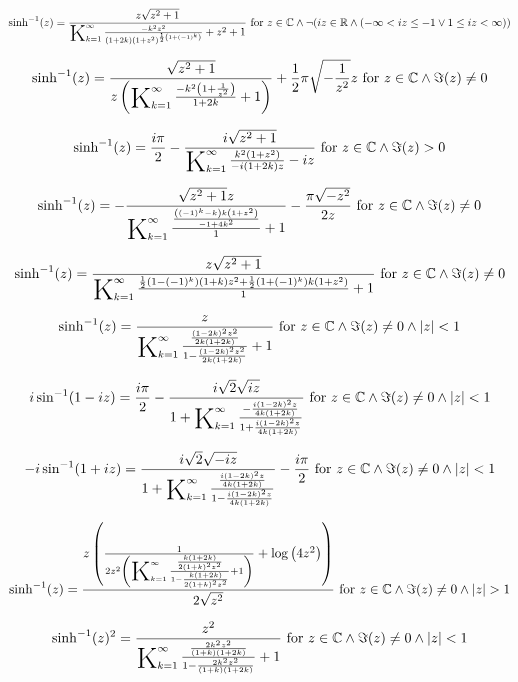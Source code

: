 \documentclass{article}
\newcommand{\bigK}{\mathop{\raisebox{-5pt}{\huge K}}}
\begin{document}
\[\sinh ^{-1}(z)=\frac{z \sqrt{z^2+1}}{\bigK_{k=1}^{\infty}\frac{-k^2 z^2}{(1+2 k) \left(1+z^2\right)^{\frac{1}{2} \left(1+(-1)^k\right)}}+z^2+1}\text{ for }z\in \mathbb{C}\land \neg (i z\in \mathbb{R}\land (-\infty <i z\leq -1\lor 1\leq i z<\infty ))\] 

\[\sinh ^{-1}(z)=\frac{\sqrt{z^2+1}}{z \left(\bigK_{k=1}^{\infty}\frac{-k^2 \left(1+\frac{1}{z^2}\right)}{1+2 k}+1\right)}+\frac{1}{2} \pi  \sqrt{-\frac{1}{z^2}} z\text{ for }z\in \mathbb{C}\land \Im(z)\neq 0\] 

\[\sinh ^{-1}(z)=\frac{i \pi }{2}-\frac{i \sqrt{z^2+1}}{\bigK_{k=1}^{\infty}\frac{k^2 \left(1+z^2\right)}{-i (1+2 k) z}-i z}\text{ for }z\in \mathbb{C}\land \Im(z)>0\] 

\[\sinh ^{-1}(z)=-\frac{\sqrt{z^2+1} z}{\bigK_{k=1}^{\infty}\frac{\frac{\left((-1)^k-k\right) k \left(1+z^2\right)}{-1+4 k^2}}{1}+1}-\frac{\pi  \sqrt{-z^2}}{2 z}\text{ for }z\in \mathbb{C}\land \Im(z)\neq 0\] 

\[\sinh ^{-1}(z)=\frac{z \sqrt{z^2+1}}{\bigK_{k=1}^{\infty}\frac{\frac{1}{2} \left(1-(-1)^k\right) (1+k) z^2+\frac{1}{2} \left(1+(-1)^k\right) k \left(1+z^2\right)}{1}+1}\text{ for }z\in \mathbb{C}\land \Im(z)\neq 0\] 

\[\sinh ^{-1}(z)=\frac{z}{\bigK_{k=1}^{\infty}\frac{\frac{(1-2 k)^2 z^2}{2 k (1+2 k)}}{1-\frac{(1-2 k)^2 z^2}{2 k (1+2 k)}}+1}\text{ for }z\in \mathbb{C}\land \Im(z)\neq 0\land \left| z\right| <1\] 

\[i \sin ^{-1}(1-i z)=\frac{i \pi }{2}-\frac{i \sqrt{2} \sqrt{i z}}{1+\bigK_{k=1}^{\infty}\frac{-\frac{i (1-2 k)^2 z}{4 k (1+2 k)}}{1+\frac{i (1-2 k)^2 z}{4 k (1+2 k)}}}\text{ for }z\in \mathbb{C}\land \Im(z)\neq 0\land \left| z\right| <1\] 

\[-i \sin ^{-1}(1+i z)=\frac{i \sqrt{2} \sqrt{-i z}}{1+\bigK_{k=1}^{\infty}\frac{\frac{i (1-2 k)^2 z}{4 k (1+2 k)}}{1-\frac{i (1-2 k)^2 z}{4 k (1+2 k)}}}-\frac{i \pi }{2}\text{ for }z\in \mathbb{C}\land \Im(z)\neq 0\land \left| z\right| <1\] 

\[\sinh ^{-1}(z)=\frac{z \left(\frac{1}{2 z^2 \left(\bigK_{k=1}^{\infty}\frac{\frac{k (1+2 k)}{2 (1+k)^2 z^2}}{1-\frac{k (1+2 k)}{2 (1+k)^2 z^2}}+1\right)}+\log \left(4 z^2\right)\right)}{2 \sqrt{z^2}}\text{ for }z\in \mathbb{C}\land \Im(z)\neq 0\land \left| z\right| >1\] 

\[\sinh ^{-1}(z)^2=\frac{z^2}{\bigK_{k=1}^{\infty}\frac{\frac{2 k^2 z^2}{(1+k) (1+2 k)}}{1-\frac{2 k^2 z^2}{(1+k) (1+2 k)}}+1}\text{ for }z\in \mathbb{C}\land \Im(z)\neq 0\land \left| z\right| <1\] 
\end{document}
